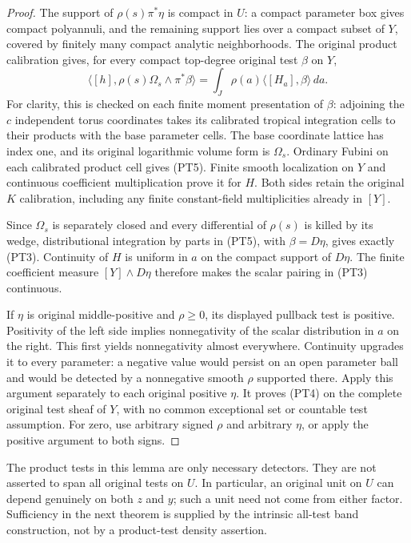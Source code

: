 \documentclass[11pt,a4paper]{article}
\numberwithin{equation}{section}
\theoremstyle{definition}
\theoremstyle{remark}
\begin{document}
\begin{proof}
The support of $\rho(s)\pi^*\eta$ is compact in $U$: a compact
parameter box gives compact polyannuli, and the remaining support
lies over a compact subset of $Y$, covered by finitely many compact
analytic neighborhoods. The original product calibration gives,
for every compact top-degree original test $\beta$ on $Y$,
\[
 \langle[h],\rho(s)\Omega_s\wedge\pi^*\beta\rangle
       =\int_J\rho(a)\langle[H_a],\beta\rangle\,da.
 \tag{PT5}
\]
For clarity, this is checked on each finite moment presentation of
$\beta$: adjoining the $c$ independent torus coordinates takes its
calibrated tropical integration cells to their products with
the base parameter cells. The base coordinate lattice has index one,
and its original logarithmic volume form is $\Omega_s$. Ordinary
Fubini on each calibrated product cell gives (PT5). Finite smooth
localization on $Y$ and continuous coefficient multiplication prove
it for $H$. Both sides retain the original $K$ calibration, including
any finite constant-field multiplicities already in $[Y]$.

Since $\Omega_s$ is separately closed and every differential of
$\rho(s)$ is killed by its wedge, distributional integration by
parts in (PT5), with $\beta=D\eta$, gives exactly (PT3).
Continuity of $H$ is uniform in $a$ on the compact support of
$D\eta$. The finite coefficient measure $[Y]\wedge D\eta$
therefore makes the scalar pairing in (PT3) continuous.

If $\eta$ is original middle-positive and $\rho\ge0$, its displayed
pullback test is positive. Positivity of the left side implies
nonnegativity of the scalar distribution in $a$ on the right. This
first yields nonnegativity almost everywhere. Continuity upgrades
it to every parameter: a negative value would persist on an open
parameter ball and would be detected by a nonnegative smooth
$\rho$ supported there. Apply this argument separately to each
original positive $\eta$. It proves (PT4) on the complete original
test sheaf of $Y$, with no common exceptional set or countable
test assumption. For zero, use arbitrary signed $\rho$ and arbitrary
$\eta$, or apply the positive argument to both signs.
\end{proof}

The product tests in this lemma are only necessary detectors. They
are not asserted to span all original tests on $U$. In particular,
an original unit on $U$ can depend genuinely on both $z$ and $y$;
such a unit need not come from either factor. Sufficiency in the
next theorem is supplied by the intrinsic all-test band construction,
not by a product-test density assertion.
\end{document}
